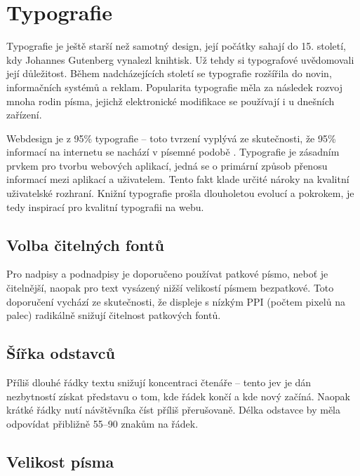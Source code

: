 \section{Typografie}
\label{sec:typografie}

\begin{quote}
     \cite{svalbach}
\end{quote}

\noindent
Typografie je ještě starší než samotný design, její počátky sahají do 15. století, kdy Johannes Gutenberg vynalezl knihtisk. Už tehdy si typografové uvědomovali její důležitost. Během nadcházejících století se typografie rozšířila do novin, informačních systémů a reklam. Popularita typografie měla za následek rozvoj mnoha rodin písma, jejichž elektronické modifikace se používají i u dnešních zařízení.

Webdesign je z 95\% typografie -- toto tvrzení vyplývá ze skutečnosti, že 95\% informací na internetu se nachází v písemné podobě \cite{typography}. Typografie je zásadním prvkem pro tvorbu webových aplikací, jedná se o primární způsob přenosu informací mezi aplikací a uživatelem. Tento fakt klade určité nároky na kvalitní uživatelské rozhraní. Knižní typografie prošla dlouholetou evolucí a pokrokem, je tedy inspirací pro kvalitní typografii na webu.

\subsection{Volba čitelných fontů}

Pro nadpisy a podnadpisy je doporučeno používat patkové písmo, neboť je čitelnější, naopak pro text vysázený nižší velikostí písmem bezpatkové. Toto doporučení vychází ze skutečnosti, že displeje s nízkým PPI (počtem pixelů na palec) radikálně snižují čitelnost patkových fontů.

\subsection{Šířka odstavců}

Příliš dlouhé řádky textu snižují koncentraci čtenáře -- tento jev je dán nezbytností získat představu o tom, kde řádek končí a kde nový začíná. Naopak krátké řádky nutí návštěvníka číst příliš přerušovaně. Délka odstavce by měla odpovídat přibližně 55--90 znakům na řádek.

\subsection{Velikost písma}


